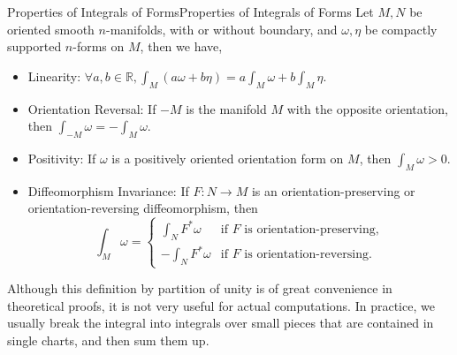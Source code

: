 \documentclass[../main.tex]{subfiles}
\begin{document}
\begin{proposition}{Properties of Integrals of Forms}{Properties of Integrals of Forms}
  Let $M,N$ be oriented smooth $n$-manifolds, with or without boundary, and $\omega, \eta$ be compactly supported $n$-forms on $M$, then we have,
  \begin{itemize}
    \item Linearity: $\displaystyle \forall a,b\in \mathbb{R}, \int_M (a\omega + b\eta) = a\int_M \omega + b\int_M \eta$.
    \item Orientation Reversal: If $-M$ is the manifold $M$ with the opposite orientation, then $\displaystyle \int_{-M} \omega = -\int_M \omega$.
    \item Positivity: If $\omega$ is a positively oriented orientation form on $M$, then $\displaystyle \int_M \omega > 0$.
    \item Diffeomorphism Invariance: If $F: N\to M$ is an orientation-preserving or orientation-reversing diffeomorphism, then
      \begin{equation*}
        \int_M \omega = \begin{cases}
          \displaystyle \int_N F^*\omega & \text{if $F$ is orientation-preserving},\\
          \displaystyle -\int_N F^*\omega & \text{if $F$ is orientation-reversing}.
        \end{cases}
      \end{equation*}
  \end{itemize}
\end{proposition}

Although this definition by partition of unity is of great convenience in theoretical proofs, it is not very useful for actual computations. In practice, we usually break the integral into integrals over small pieces that are contained in single charts, and then sum them up.
\end{document}
